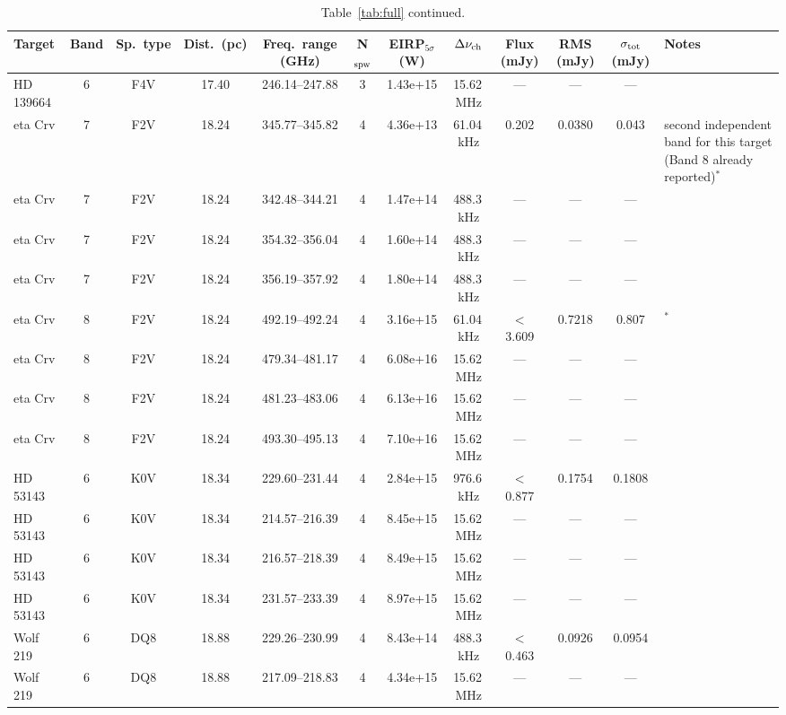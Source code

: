 \documentclass{openjournal}
\begin{document}
\begin{table}
\centering
\scriptsize
\setlength{\tabcolsep}{2pt}
\caption{Table~\ref{tab:full} continued.}
\label{tab:full7}
\begin{tabularx}{\textwidth}{@{}l c c c c c c c c c c X@{}}
\hline
Target & Band & Sp.\ type & Dist.\ (pc) & Freq.\ range (GHz) & N$_{\rm spw}$ & EIRP$_{5\sigma}$ (W) & $\Delta\nu_{\rm ch}$ & Flux (mJy) & RMS (mJy) & $\sigma_{\rm tot}$ (mJy) & Notes \\
\hline
 HD 139664 & 6 & F4V & 17.40 & 246.14--247.88 & 3 & 1.43e+15 & 15.62\,MHz & --- & --- & --- &  \\
 eta Crv & 7 & F2V & 18.24 & 345.77--345.82 & 4 & 4.36e+13 & 61.04\,kHz & 0.202 & 0.0380 & 0.043 & second independent band for this target (Band 8 already reported)$^{\ast}$ \\
 eta Crv & 7 & F2V & 18.24 & 342.48--344.21 & 4 & 1.47e+14 & 488.3\,kHz & --- & --- & --- &  \\
 eta Crv & 7 & F2V & 18.24 & 354.32--356.04 & 4 & 1.60e+14 & 488.3\,kHz & --- & --- & --- &  \\
 eta Crv & 7 & F2V & 18.24 & 356.19--357.92 & 4 & 1.80e+14 & 488.3\,kHz & --- & --- & --- &  \\
 eta Crv & 8 & F2V & 18.24 & 492.19--492.24 & 4 & 3.16e+15 & 61.04\,kHz & $<$3.609 & 0.7218 & 0.807 & $^{\ast}$ \\
 eta Crv & 8 & F2V & 18.24 & 479.34--481.17 & 4 & 6.08e+16 & 15.62\,MHz & --- & --- & --- &  \\
 eta Crv & 8 & F2V & 18.24 & 481.23--483.06 & 4 & 6.13e+16 & 15.62\,MHz & --- & --- & --- &  \\
 eta Crv & 8 & F2V & 18.24 & 493.30--495.13 & 4 & 7.10e+16 & 15.62\,MHz & --- & --- & --- &  \\
 HD 53143 & 6 & K0V & 18.34 & 229.60--231.44 & 4 & 2.84e+15 & 976.6\,kHz & $<$0.877 & 0.1754 & 0.1808 &  \\
 HD 53143 & 6 & K0V & 18.34 & 214.57--216.39 & 4 & 8.45e+15 & 15.62\,MHz & --- & --- & --- &  \\
 HD 53143 & 6 & K0V & 18.34 & 216.57--218.39 & 4 & 8.49e+15 & 15.62\,MHz & --- & --- & --- &  \\
 HD 53143 & 6 & K0V & 18.34 & 231.57--233.39 & 4 & 8.97e+15 & 15.62\,MHz & --- & --- & --- &  \\
 Wolf  219 & 6 & DQ8 & 18.88 & 229.26--230.99 & 4 & 8.43e+14 & 488.3\,kHz & $<$0.463 & 0.0926 & 0.0954 &  \\
 Wolf  219 & 6 & DQ8 & 18.88 & 217.09--218.83 & 4 & 4.34e+15 & 15.62\,MHz & --- & --- & --- &  \\

\end{tabularx}
\end{table}
\end{document}
